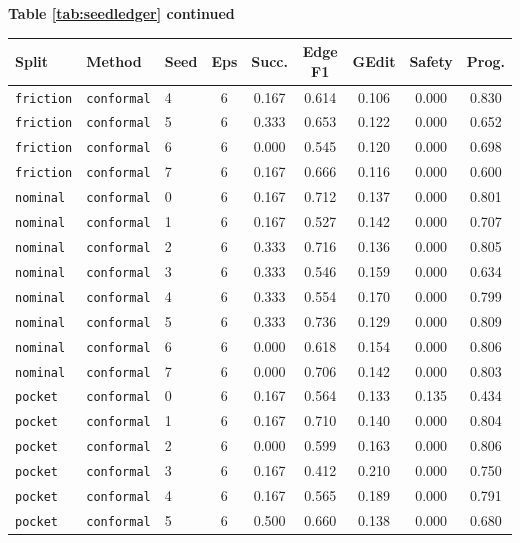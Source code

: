 \documentclass{article}
\begin{document}
\begin{center}
\textbf{Table \ref{tab:seedledger} continued}\\[0.4ex]
\begin{tabular}{lllcccccc}
\toprule
Split & Method & Seed & Eps & Succ. & Edge F1 & GEdit & Safety & Prog. \\
\midrule
\texttt{friction} & \texttt{conformal} & 4 & 6 & 0.167 & 0.614 & 0.106 & 0.000 & 0.830 \\
\texttt{friction} & \texttt{conformal} & 5 & 6 & 0.333 & 0.653 & 0.122 & 0.000 & 0.652 \\
\texttt{friction} & \texttt{conformal} & 6 & 6 & 0.000 & 0.545 & 0.120 & 0.000 & 0.698 \\
\texttt{friction} & \texttt{conformal} & 7 & 6 & 0.167 & 0.666 & 0.116 & 0.000 & 0.600 \\
\texttt{nominal} & \texttt{conformal} & 0 & 6 & 0.167 & 0.712 & 0.137 & 0.000 & 0.801 \\
\texttt{nominal} & \texttt{conformal} & 1 & 6 & 0.167 & 0.527 & 0.142 & 0.000 & 0.707 \\
\texttt{nominal} & \texttt{conformal} & 2 & 6 & 0.333 & 0.716 & 0.136 & 0.000 & 0.805 \\
\texttt{nominal} & \texttt{conformal} & 3 & 6 & 0.333 & 0.546 & 0.159 & 0.000 & 0.634 \\
\texttt{nominal} & \texttt{conformal} & 4 & 6 & 0.333 & 0.554 & 0.170 & 0.000 & 0.799 \\
\texttt{nominal} & \texttt{conformal} & 5 & 6 & 0.333 & 0.736 & 0.129 & 0.000 & 0.809 \\
\texttt{nominal} & \texttt{conformal} & 6 & 6 & 0.000 & 0.618 & 0.154 & 0.000 & 0.806 \\
\texttt{nominal} & \texttt{conformal} & 7 & 6 & 0.000 & 0.706 & 0.142 & 0.000 & 0.803 \\
\texttt{pocket} & \texttt{conformal} & 0 & 6 & 0.167 & 0.564 & 0.133 & 0.135 & 0.434 \\
\texttt{pocket} & \texttt{conformal} & 1 & 6 & 0.167 & 0.710 & 0.140 & 0.000 & 0.804 \\
\texttt{pocket} & \texttt{conformal} & 2 & 6 & 0.000 & 0.599 & 0.163 & 0.000 & 0.806 \\
\texttt{pocket} & \texttt{conformal} & 3 & 6 & 0.167 & 0.412 & 0.210 & 0.000 & 0.750 \\
\texttt{pocket} & \texttt{conformal} & 4 & 6 & 0.167 & 0.565 & 0.189 & 0.000 & 0.791 \\
\texttt{pocket} & \texttt{conformal} & 5 & 6 & 0.500 & 0.660 & 0.138 & 0.000 & 0.680 \\

\end{tabular}
\end{center}
\end{document}
